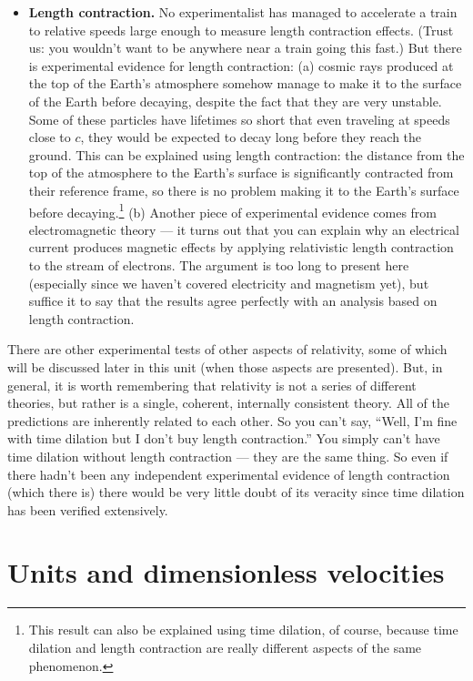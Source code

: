 \begin{itemize}
\item \textbf{Length contraction.}  No experimentalist has managed to
accelerate a train to relative speeds large enough to measure length
contraction effects.  (Trust us: you wouldn't want to be anywhere near
a train going this fast.)  But there is experimental evidence for
length contraction: (a) cosmic rays produced at the top of the Earth's
atmosphere somehow manage to make it to the surface of the Earth
before decaying, despite the fact that they are very unstable.  Some
of these particles have lifetimes so short that even traveling at
speeds close to $c$, they would be expected to decay long before they
reach the ground.  This can be explained using length contraction: the
distance from the top of the atmosphere to the Earth's surface is
significantly contracted from their reference frame, so there is no
problem making it to the Earth's surface before
decaying.\footnote{This result can also be explained using time
dilation, of course, because time dilation and length contraction are
really different aspects of the same phenomenon.} (b) Another piece of
experimental evidence comes from electromagnetic theory --- it turns out
that you can explain why an electrical current produces magnetic
effects by applying relativistic length contraction to the stream of
electrons.  The argument is too long to present here (especially since
we haven't covered electricity and magnetism yet), but suffice it to
say that the results agree perfectly with an analysis based on length
contraction.
\end{itemize}
   
There are other experimental tests of other aspects of relativity,
some of which will be discussed later in this unit (when those aspects
are presented).  But, in general, it is worth remembering that
relativity is not a series of different theories, but rather is a
single, coherent, internally consistent theory.  All of the
predictions are inherently related to each other.  So you can't say,
``Well, I'm fine with time dilation but I don't buy length
contraction.''  You simply can't have time dilation without length
contraction --- they are the same thing. So even if there hadn't been
any independent experimental evidence of length contraction (which
there is) there would be very little doubt of its veracity since time
dilation has been verified extensively.

\section{Units and dimensionless velocities}

